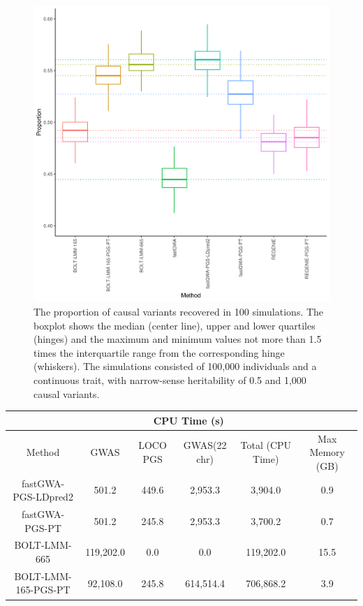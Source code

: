 \documentclass[fleqn,10pt]{wlscirep}
\begin{document}
\begin{figure}
\centering
\includegraphics[width=120mm]{images/Fig1_combiorev}
\caption{
        The proportion of causal variants recovered in 100 simulations. The
boxplot shows the median (center line), upper and lower quartiles (hinges) and the maximum and minimum values not more than 1.5 times the interquartile range from the corresponding hinge (whiskers). The simulations consisted of 100,000 individuals and a continuous trait, with narrow-sense heritability of 0.5 and 1,000 causal variants.}
\label{fig:Recovery of causal variants in fixed simulations.}
\end{figure}


\begin{table}[ht]
\centering

\begin{adjustbox}{width=\columnwidth,center}
\begin{tabular}{c|cccc|c}
\toprule
      & \multicolumn{4}{c|}{CPU Time (s)} & \multicolumn{1}{c}{} \\
\hline
  Method & GWAS & LOCO PGS & GWAS(22 chr) & Total (CPU Time) &  Max Memory (GB) \\ 
  \hline
  fastGWA-PGS-LDpred2 & 501.2 & 449.6 & 2,953.3 & 3,904.0 &  0.9  \\ 
  fastGWA-PGS-PT & 501.2 & 245.8 & 2,953.3 & 3,700.2 &  0.7  \\ 
  BOLT-LMM-665 & 119,202.0 & 0.0 & 0.0 & 119,202.0 &  15.5    \\ 
  BOLT-LMM-165-PGS-PT & 92,108.0 & 245.8 & 614,514.4 & 706,868.2 &  3.9   
 \\ 
   \hline
\end{tabular}%
\end{adjustbox}
\end{table}
\end{document}
